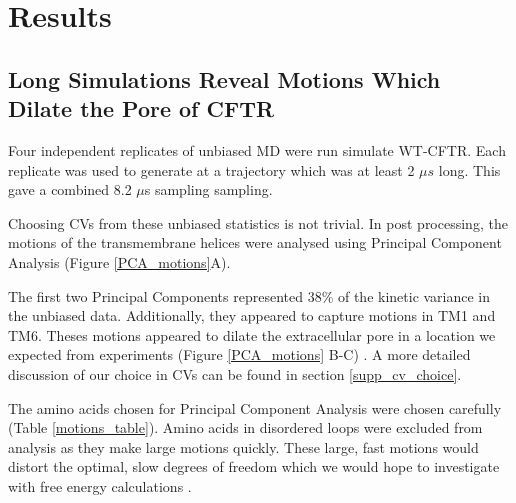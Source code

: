 \section{Results}

\subsection{Long Simulations Reveal Motions Which Dilate the Pore of CFTR}
Four independent replicates of unbiased MD were run simulate WT-CFTR. Each replicate was used to generate at a trajectory which was at least 2 $\mu s$ long. This gave a combined 8.2 $\mu$s sampling sampling. 

Choosing CVs from these unbiased statistics is not trivial. In post processing, the motions of the transmembrane helices were analysed using Principal Component Analysis \cite{pearson1901, hotelling1936} (Figure \ref{PCA_motions}A). 

The first two Principal Components represented 38\% of the kinetic variance in the unbiased data. Additionally, they appeared to capture motions in TM1 and TM6. Theses motions appeared to dilate the extracellular pore in a location we expected from experiments (Figure \ref{PCA_motions} B-C) \cite{linsdell2018, negoda2018, negoda2019}. A more detailed discussion of our choice in CVs can be found in section \ref{supp_cv_choice}. 

The amino acids chosen for Principal Component Analysis were chosen carefully (Table \ref{motions_table}). Amino acids in disordered loops were excluded from analysis as they make large motions quickly. These large, fast motions would distort the optimal, slow degrees of freedom which we would hope to investigate with free energy calculations \cite{noe2001}. 

